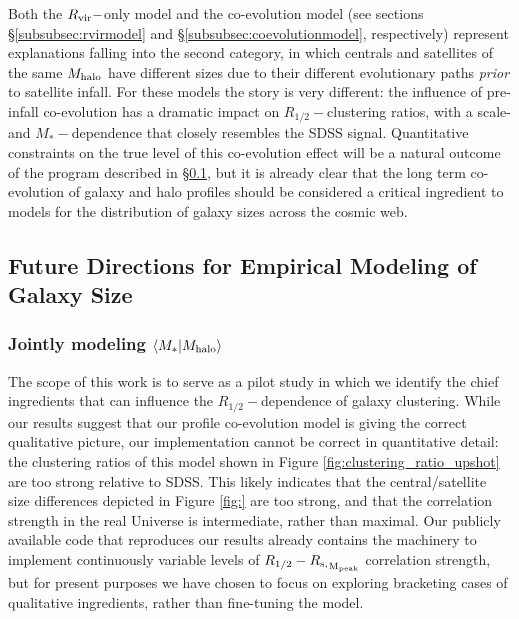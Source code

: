 \documentclass[usenatbib,usegraphicx,letterpaper]{mn2e}
\newcommand{\rhalf}{R_{1/2}}
\newcommand{\mstar}{M_{\ast}}
\newcommand{\mhalo}{M_{\rm halo}}
\newcommand{\rvir}{R_{\rm vir}}
\newcommand{\rspeak}{{R_{\rm s,}}_{\rm M_{peak}}}
\begin{document}
Both the $\rvir-$only model and the co-evolution model (see sections \S\ref{subsubsec:rvirmodel} and \S\ref{subsubsec:coevolutionmodel}, respectively) represent explanations falling into the second category, in which centrals and satellites of the same $\mhalo$ have different sizes due to their different evolutionary paths {\em prior} to satellite infall. For these models the story is very different: the influence of pre-infall co-evolution has a dramatic impact on $\rhalf-$clustering ratios, with a scale- and $\mstar-$dependence that closely resembles the SDSS signal. Quantitative constraints on the true level of this co-evolution effect will be a natural outcome of the program described in \S\ref{subsec:future}, but it is already clear that the long term co-evolution of galaxy and halo profiles should be considered a critical ingredient to models for the distribution of galaxy sizes across the cosmic web. 

\subsection{Future Directions for Empirical Modeling of Galaxy Size}
\label{subsec:future}

\subsubsection{Jointly modeling $\langle\mstar\vert\mhalo\rangle$}

The scope of this work is to serve as a pilot study in which we identify the chief ingredients that can influence the $\rhalf-$dependence of galaxy clustering. While our results suggest that our profile co-evolution model is giving the correct qualitative picture, our implementation cannot be correct in quantitative detail: the clustering ratios of this model shown in Figure \ref{fig:clustering_ratio_upshot} are too strong relative to SDSS. This likely indicates that the central/satellite size differences depicted in Figure \ref{fig:} are too strong, and that the correlation strength in the real Universe is intermediate, rather than maximal. Our publicly available code that reproduces our results already contains the machinery to implement continuously variable levels of $\rhalf-\rspeak$ correlation strength, but for present purposes we have chosen to focus on exploring bracketing cases of qualitative ingredients, rather than fine-tuning the model. 
\end{document}
